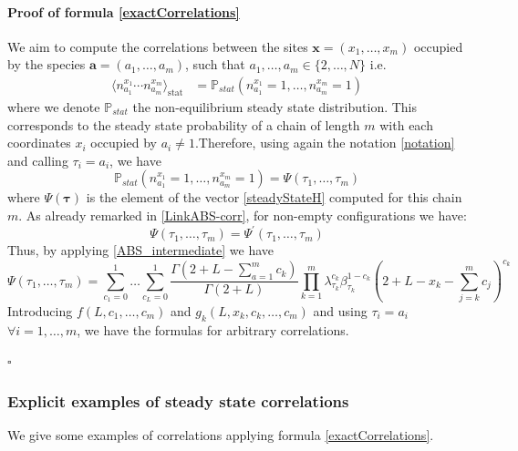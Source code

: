 \documentclass[11pt]{article}
\numberwithin{equation}{section}
\numberwithin{equation}{subsection}
\begin{document}
 \paragraph{Proof of formula \eqref{exactCorrelations}}
 We aim to compute the correlations between the sites $\mathbf{x}=\left(x_{1},\ldots,x_{m}\right)$ occupied by the species $\mathbf{a}=\left(a_{1},\ldots,a_{m}\right)$, such that $a_{1},\ldots,a_{m}\in \{2,\ldots,N\}$ i.e. 
\begin{equation}\label{Prob-m}
	\begin{split}
		\langle n_{a_{1}}^{x_{1}}\cdots n_{a_{m}}^{x_{m}}\rangle_{\text{stat}}&
		=\mathbb{P}_{stat}\left(n_{a_{1}}^{x_{1}}=1,\ldots,n_{a_{m}}^{x_{m}}=1\right)
	\end{split}
\end{equation}
where we denote $\mathbb{P}_{stat}$ the non-equilibrium steady state distribution. 
This corresponds to the steady state probability of a chain of length $m$ with each coordinates $x_{i}$ occupied by $a_{i}\neq 1$.Therefore, using again the notation \eqref{notation} and calling $\tau_{i}=a_{i}$, we have 
\begin{equation}
	\mathbb{P}_{stat}\left(n_{a_{1}}^{x_{1}}=1,\ldots,n_{a_{m}}^{x_{m}}=1\right)=\Psi\left(\tau_{1},\ldots,\tau_{m}\right)
\end{equation}
where $\Psi(\bm{\tau})$ is the element of the vector \eqref{steadyStateH} computed for this chain $m$.
As already remarked in \eqref{LinkABS-corr}, for non-empty configurations we have:
\begin{equation}\label{Corr-mABS}
	\Psi(\tau_{1},\ldots,\tau_{m})=\Psi^{'}(\tau_{1},\ldots,\tau_{m})
\end{equation}
Thus, by applying \eqref{ABS_intermediate} we have 
\begin{equation}
	\Psi(\tau_{1},\ldots,\tau_{m})=\sum_{c_{1}=0}^{1}\ldots\sum_{c_{L}=0}^{1}\frac{\Gamma(2+L-\sum_{a=1}^{m}c_{k})}{\Gamma(2+L)}\prod_{k=1}^{m}\lambda_{\tau_{k}}^{c_{k}}\beta_{\tau_{k}}^{1-c_{k}}\left(2+L-x_{k}-\sum_{j=k}^{m}c_{j}\right)^{c_{k}}
\end{equation}
Introducing $f(L,c_{1},\ldots,c_{m})$ and $g_{k}(L,x_{k},c_{k},\ldots,c_{m})$ and using $\tau_{i}=a_{i}$ $\forall i=1,\ldots,m$, we have the formulas for arbitrary correlations.
\begin{flushright}
    $\square$
\end{flushright}
\subsubsection{Explicit examples of steady state correlations}
We give some examples of correlations applying formula \eqref{exactCorrelations}.
\end{document}

